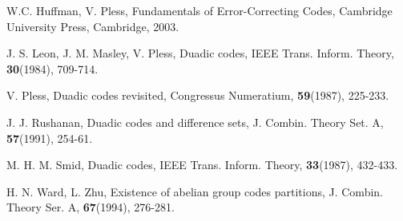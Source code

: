 \documentclass{article}
\numberwithin{equation}{section}
\numberwithin{table}{section}
\begin{document}
\begin{thebibliography}{99}
 W.C. Huffman, V. Pless, Fundamentals of Error-Correcting Codes, Cambridge University Press, Cambridge, 2003.

J. S. Leon, J. M. Masley,  V. Pless, Duadic codes,
IEEE Trans. Inform. Theory,  {\bf 30}(1984),
709-714.


V. Pless, Duadic codes revisited,  Congressus Numeratium, {\bf 59}(1987),
225-233.

J. J. Rushanan,   Duadic codes and difference sets,
J. Combin. Theory Set. A,  {\bf 57}(1991), 254-61.


M. H. M. Smid, Duadic codes, IEEE Trans. Inform. Theory,
 {\bf 33}(1987),  432-433.

H. N. Ward, L. Zhu,  Existence of abelian group codes partitions,
J. Combin. Theory Ser. A,  {\bf67}(1994), 276-281.


\end{thebibliography}
\end{document}
